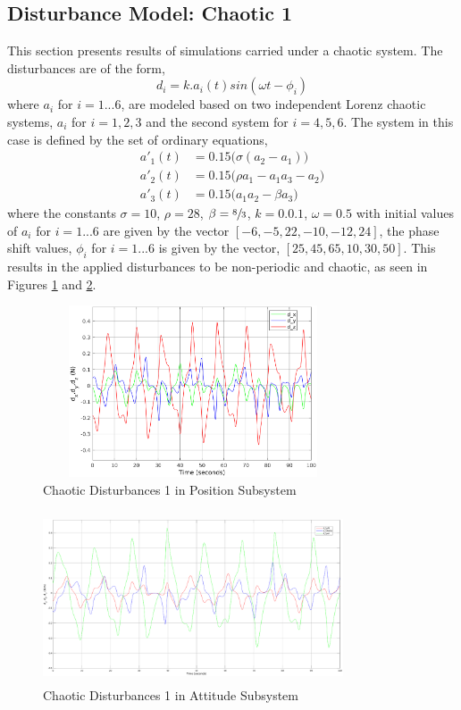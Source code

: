 \documentclass[letterpaper%
, twoside%
, 12pt%
,memoire%
, english%
,creativecommons,hyperref%
]{thETS}
\begin{document}
\subsection{Disturbance Model: Chaotic 1}
This section presents results of simulations carried under a chaotic system. The disturbances are of the form,
\begin{equation}
d_i = k.a_i(t)sin(\omega t-\phi_i)
\label{eq:dist_1}
\end{equation}
where $a_i$ for $i=1...6$, are modeled based on two independent Lorenz chaotic systems, $a_i$ for $i=1,2,3$ and the second system for $i=4,5,6$. The system in this case is defined by the set of ordinary equations, 
\begin{subequations}
\begin{align}
a'_1(t) &= 0.15\big(\sigma(a_2-a_1)\big)\\
a'_2(t) &= 0.15\big(\rho a_1 - a_1 a_3 - a_2\big)\\
a'_3(t) &= 0.15\big(a_1 a_2 - \beta a_3\big)
\end{align}
\end{subequations}
where the constants $\sigma=10$, $\rho=28$, $\beta=\sfrac{8}{3}$, $k=0.0.1$, $\omega=0.5$ with initial values of $a_i$ for $i=1...6$ are given by the vector $[-6,-5,22,-10,-12,24]$, the phase shift values, $\phi_i$ for $i=1...6$ is given by the vector, $[25,45,65,10,30,50]$. This results in the applied disturbances to be non-periodic and chaotic, as seen in Figures \ref{dis_m1_pos} and \ref{dis_m1_att}.

\begin{figure}[H]
\centering
\includegraphics[width=3.5in,height=2in]{Figures/results/chaotic_disturbances/dis_m1_pos.eps}
\caption{Chaotic Disturbances 1 in Position Subsystem}
\label{dis_m1_pos}
\end{figure}

\begin{figure}[H]
\centering
\includegraphics[width=3.5in,height=2in]{Figures/results/chaotic_disturbances/dis_m1_att.eps}
\caption{Chaotic Disturbances 1 in Attitude Subsystem}
\label{dis_m1_att}
\end{figure}
\end{document}
